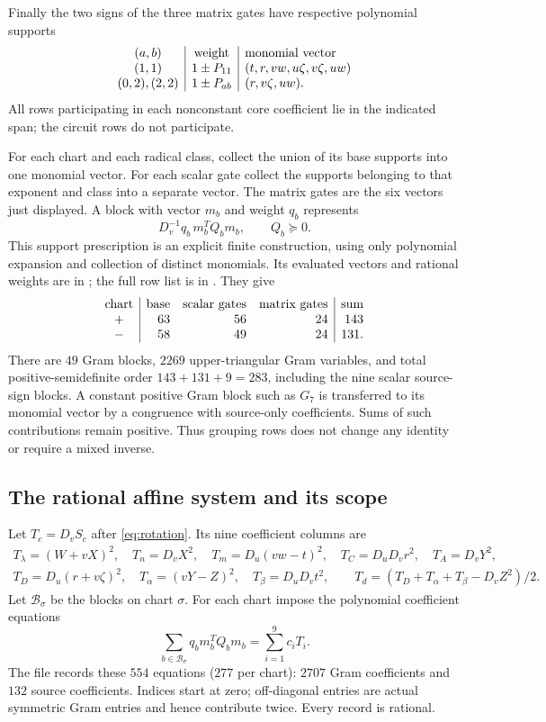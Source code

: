 Finally the two signs of the three matrix gates have respective
polynomial supports
\[
 \begin{array}{c|c|l}
 (a,b)&\hbox{weight}&\hbox{monomial vector}\\
 (1,1)&1\pm P_{11}&(t,r,vw,u\zeta,v\zeta,uw)\\
 (0,2),(2,2)&1\pm P_{ab}&(r,v\zeta,uw).
 \end{array}
\]
All rows participating in each nonconstant core coefficient lie in
the indicated span; the circuit rows do not participate.

For each chart and each radical class, collect the union of its base
supports into one monomial vector. For each scalar gate collect the
supports belonging to that exponent and class into a separate vector.
The matrix gates are the six vectors just displayed. A block with
vector $m_b$ and weight $q_b$ represents
\[
        D_v^{-1}q_b\,m_b^TQ_bm_b,\qquad Q_b\succeq0.
\]
This support prescription is an explicit finite construction, using
only polynomial expansion and collection of distinct monomials.
Its evaluated vectors and rational weights are in
; the full row list is in
. They give
\[
\begin{array}{c|rrr|r}
 \hbox{chart}&\hbox{base}&\hbox{scalar gates}&\hbox{matrix gates}&\hbox{sum}\\
 +&63&56&24&143\\
 -&58&49&24&131.
\end{array}
\]
There are $49$ Gram blocks, $2269$ upper-triangular Gram variables,
and total positive-semidefinite order $143+131+9=283$, including the
nine scalar source-sign blocks. A constant positive Gram block such
as $G_7$ is transferred to its monomial vector by a congruence with
source-only coefficients. Sums of such contributions remain positive.
Thus grouping rows does not change any identity or require a mixed inverse.

\subsection*{The rational affine system and its scope}
Let $T_c=D_vS_c$ after \eqref{eq:rotation}. Its nine coefficient columns are
\begin{gather*}
 T_\lambda=(W+vX)^2,\quad T_n=D_vX^2,\quad
 T_m=D_u(vw-t)^2,\quad T_C=D_uD_vr^2,\quad T_A=D_vY^2,\\
 T_D=D_u(r+v\zeta)^2,\quad T_\alpha=(vY-Z)^2,\quad
 T_\beta=D_uD_vt^2,\qquad
 T_d=(T_D+T_\alpha+T_\beta-D_vZ^2)/2.
\end{gather*}
Let $\mathcal B_\sigma$ be the blocks on chart $\sigma$.
For each chart impose the polynomial coefficient equations
\[
       \sum_{b\in\mathcal B_\sigma}q_bm_b^TQ_bm_b
          =\sum_{i=1}^9 c_iT_i .
\]
The file  records these $554$ equations
($277$ per chart): $2707$ Gram coefficients and $132$ source coefficients.
Indices start at zero; off-diagonal entries are actual symmetric Gram
entries and hence contribute twice. Every record is rational.

